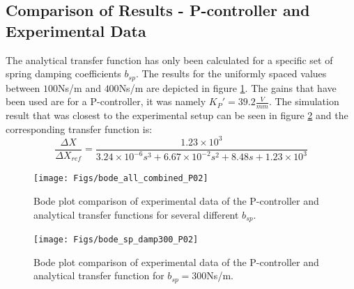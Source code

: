 	\subsection{Comparison of Results - P-controller and Experimental Data}
	The analytical transfer function has only been calculated for a specific set of spring damping coefficients $b_{sp}$. The results for the uniformly spaced values between $100$Ns/m and $400$Ns/m are depicted in figure \ref{fig:bode_all_combined_P02}. The gains that have been used are for a P-controller, it was namely $K_P' = 39.2 \frac{\textit{V}}{\textit{mm}}$. The simulation result that was closest to the experimental setup can be seen in figure \ref{fig:bode_sp_damp300_P02} and the corresponding transfer function is:
	\begin{equation}
		\frac{\Delta X}{\Delta X_{ref}} = \frac{1.23 \times 10^3}{3.24\times 10^{-6}s^3 + 6.67\times 10^{-2}s^2 + 8.48s + 1.23 \times 10^3}
	\end{equation}
	

\begin{figure}[h!]
	\centering
	\texttt{[image: Figs/bode\_all\_combined\_P02]}
	\caption{Bode plot comparison of experimental data of the P-controller and analytical transfer functions for several different $b_{sp}$.}
	\label{fig:bode_all_combined_P02}
\end{figure}

\begin{figure}[h!]
	\centering
	\texttt{[image: Figs/bode\_sp\_damp300\_P02]}
	\caption{Bode plot comparison of experimental data of the P-controller and analytical transfer function for $b_{sp} = 300$Ns/m.}
	\label{fig:bode_sp_damp300_P02}
\end{figure}




